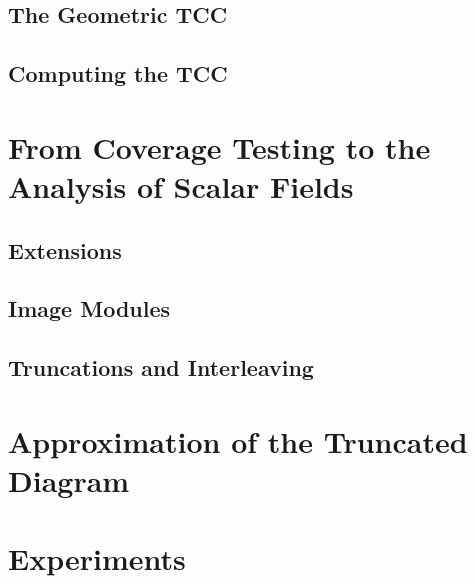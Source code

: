 \documentclass[12pt]{article}
\begin{document}
\subsection{The Geometric TCC}\label{sec:geo_tcc}
  

\subsection{Computing the TCC}
  

\section{From Coverage Testing to the Analysis of Scalar Fields}\label{sec:middle}


\subsection{Extensions}
  

\subsection{Image Modules}
  

\subsection{Truncations and Interleaving}\label{sec:interleaving}
  


\section{Approximation of the Truncated Diagram}\label{sec:truncations}


\clearpage
\section{Experiments}
  

\clearpage


%
\appendix
%
\end{document}
